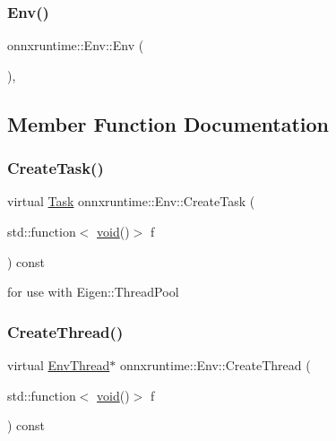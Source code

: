 \subsubsection{\texorpdfstring{Env()}{Env()}}
{\footnotesize\ttfamily onnxruntime\+::\+Env\+::\+Env (\begin{DoxyParamCaption}{ }\end{DoxyParamCaption})\hspace{0.3cm}{\ttfamily [protected]}, {\ttfamily [default]}}



\subsection{Member Function Documentation}
\mbox{\label{classonnxruntime_1_1Env_a1cb46f1c66f9ea35bcae259a38cfb84b}} 
\subsubsection{\texorpdfstring{Create\+Task()}{CreateTask()}}
{\footnotesize\ttfamily virtual \mbox{\hyperlink{structonnxruntime_1_1Env_1_1Task}{Task}} onnxruntime\+::\+Env\+::\+Create\+Task (\begin{DoxyParamCaption}\item[{std\+::function$<$ \mbox{\hyperlink{mlasi_8h_a88f941d423cb2a819b70a1358982b1a6}{void}}()$>$}]{f }\end{DoxyParamCaption}) const\hspace{0.3cm}{\ttfamily [pure virtual]}}



for use with Eigen\+::\+Thread\+Pool 

\mbox{\label{classonnxruntime_1_1Env_aced00fdfcbf0f82b59c3bad35bbdfb57}} 
\subsubsection{\texorpdfstring{Create\+Thread()}{CreateThread()}}
{\footnotesize\ttfamily virtual \mbox{\hyperlink{classonnxruntime_1_1Env_a6bb161baf73e98f7fd274db84e3fb489}{Env\+Thread}}$\ast$ onnxruntime\+::\+Env\+::\+Create\+Thread (\begin{DoxyParamCaption}\item[{std\+::function$<$ \mbox{\hyperlink{mlasi_8h_a88f941d423cb2a819b70a1358982b1a6}{void}}()$>$}]{f }\end{DoxyParamCaption}) const\hspace{0.3cm}{\ttfamily [pure virtual]}}



